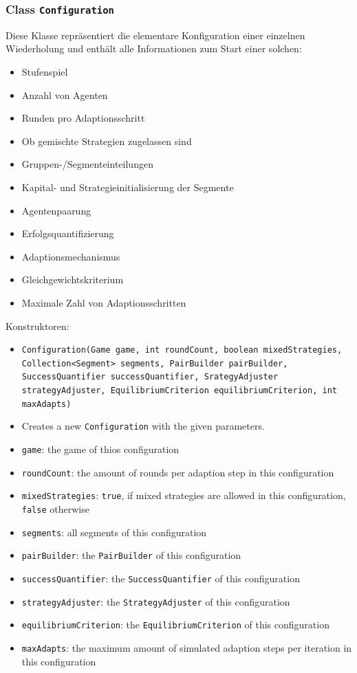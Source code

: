\documentclass[parskip=full,11pt]{scrartcl}
\begin{document}
\subsubsection{Class \texttt{Configuration}}
Diese Klasse repräsentiert die elementare Konfiguration einer einzelnen Wiederholung und enthält alle Informationen zum Start einer solchen:
\begin{itemize}\itemsep -10pt
\item Stufenspiel
\item Anzahl von Agenten
\item Runden pro Adaptionsschritt
\item Ob gemischte Strategien zugelassen sind
\item Gruppen-/Segmenteinteilungen
\item Kapital- und Strategieinitialisierung der Segmente
\item Agentenpaarung
\item Erfolgsquantifizierung
\item Adaptionsmechanismus
\item Gleichgewichtskriterium
\item Maximale Zahl von Adaptionsschritten
\end{itemize}

Konstruktoren:
\begin{itemize}\itemsep -10pt
\item \texttt{Configuration(Game game, int roundCount, boolean mixedStrategies, Collection<Segment> segments, PairBuilder pairBuilder, SuccessQuantifier successQuantifier, SrategyAdjuster strategyAdjuster, EquilibriumCriterion equilibriumCriterion, int maxAdapts)}
\item[] Creates a new \texttt{Configuration} with the given parameters.
\item[] \texttt{game}: the game of thios configuration
\item[] \texttt{roundCount}: the amount of rounds per adaption step in this configuration
\item[] \texttt{mixedStrategies}: \texttt{true}, if mixed strategies are allowed in this configuration, \texttt{false} otherwise
\item[] \texttt{segments}: all segments of this configuration
\item[] \texttt{pairBuilder}: the \texttt{PairBuilder} of this configuration
\item[] \texttt{successQuantifier}: the \texttt{SuccessQuantifier} of this configuration
\item[] \texttt{strategyAdjuster}: the \texttt{StrategyAdjuster} of this configuration
\item[] \texttt{equilibriumCriterion}: the \texttt{EquilibriumCriterion} of this configuration
\item[] \texttt{maxAdapts}: the maximum amount of simulated adaption steps per iteration in this configuration
\end{itemize}
\end{document}

